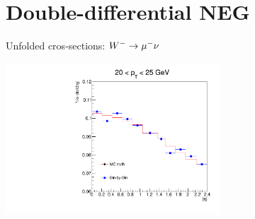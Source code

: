 \section{ Double-differential NEG }

\begin{frame}{Unfolded cros-sections: $W^- \rightarrow \mu^- \nu$}
 \begin{center}
   \includegraphics[width=0.6\textwidth]{dates/20121219/figures/xsec/NEG/Wmn_Unf_2d_Slice_1.pdf}
 \end{center}
\end{frame}

